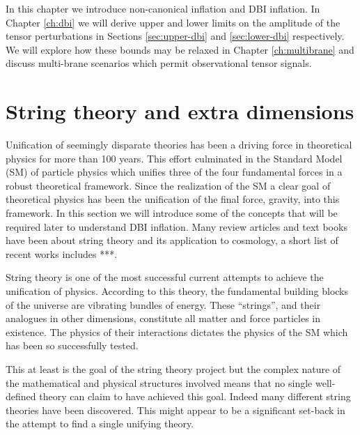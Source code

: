 In this chapter we introduce non-canonical inflation and DBI inflation.
In Chapter \ref{ch:dbi} we will derive upper and lower 
limits on the amplitude of the tensor perturbations in Sections \ref{sec:upper-dbi} and  
\ref{sec:lower-dbi} respectively.  
We will explore how these bounds may be relaxed in Chapter \ref{ch:multibrane} and discuss multi-brane 
scenarios which permit observational tensor signals. 

\section{String theory and extra dimensions}
\label{sec:extradims}
Unification of seemingly disparate theories has been a driving force in
theoretical physics for more than 100 years. This effort culminated in the
Standard Model (SM) of particle physics which unifies three of the four
fundamental forces in a robust theoretical framework. Since the realization of
the SM a clear goal of theoretical physics has been the unification of the
final force, gravity, into this framework. In this section we will introduce
some of the concepts that will be required later to understand DBI inflation.
Many review articles and text books have been about string theory and its
application to cosmology, a short list of recent works includes ***.


String theory is one of the most successful current attempts to achieve the
unification of physics. According to this theory, the fundamental
building blocks of the
universe are vibrating bundles of energy. These ``strings'', and their analogues
in other dimensions, constitute all matter and force particles in existence.
The physics of their interactions dictates the physics of the SM which has been
so successfully tested.

This at least is the goal of the string theory project but the complex nature
of the mathematical and physical structures involved means that no single
well-defined theory can claim to have achieved this goal. Indeed many different
string theories have been discovered. This might appear to be a significant
set-back in the attempt to find a single unifying theory. 

